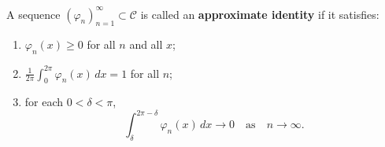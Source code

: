 A sequence $(\varphi_n)_{n=1}^{\infty} \subset \mathcal{C}$ is called an \textbf{approximate identity} if it satisfies:
\begin{enumerate}
\item[(i)] $\varphi_n(x) \geq 0$ for all $n$ and all $x$;
\item[(ii)] $\displaystyle \frac{1}{2\pi} \int_0^{2\pi} \varphi_n(x) \, dx = 1$ for all $n$;
\item[(iii)] for each $0 < \delta < \pi$,
$$\int_{\delta}^{2\pi - \delta} \varphi_n(x) \, dx \to 0 \quad \text{as} \quad n \to \infty.$$
\end{enumerate}
